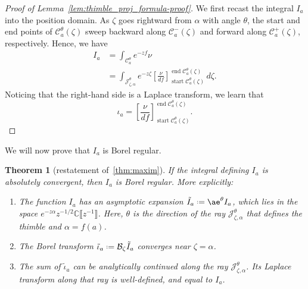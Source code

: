 \documentclass{article}
\newcommand{\C}{\mathbb{C}}
\newcommand{\series}[1]{\tilde{#1}}
\newcommand*{\defeq}{\mathrel{\vcenter{\baselineskip0.5ex \lineskiplimit0pt
                     \hbox{\scriptsize.}\hbox{\scriptsize.}}}%
                     =}
\newcommand{\borel}{\mathcal{B}}
\newcommand{\aexp}{\mathrm{\ae}}
\theoremstyle{definition}
\theoremstyle{plain}
\newtheorem{theorem}{Theorem}[section]
\begin{document}
\begin{proof}[Proof of Lemma~\ref{lem:thimble_proj_formula-proof}]
We first recast the integral $I_a$ into the position domain. As $\zeta$ goes rightward from $\alpha$ with angle $\theta$, the start and end points of $\mathcal{C}_a^\theta(\zeta)$ sweep backward along $\mathcal{C}^-_a(\zeta)$ and forward along $\mathcal{C}^+_a(\zeta)$, respectively. Hence, we have
\begin{align*}
I_a & = \int_{\mathcal{C}_a^\theta} e^{-zf} \nu \\
& = \int_{\mathcal{J}_{\zeta,\alpha}^\theta}e^{-z\zeta} \left[\frac{\nu}{df}\right]_{\operatorname{start} \mathcal{C}_a^\theta(\zeta)}^{\operatorname{end} \mathcal{C}_a^\theta(\zeta)}\,d\zeta.
\end{align*}
Noticing that the right-hand side is a Laplace transform, we learn that
\begin{equation}\label{thimble-difference}
{\iota}_a = \left[\frac{\nu}{df}\right]_{\operatorname{start} \mathcal{C}_a^\theta(\zeta)}^{\operatorname{end} \mathcal{C}_a^\theta(\zeta)}.
\end{equation}
\end{proof}
We will now prove that $I_a$ is Borel regular.
\begin{theorem}[restatement of~\ref{thm:maxim}]\label{thm:maxim-proof}
If the integral defining $I_a$ is absolutely convergent, then $I_a$ is Borel regular. More explicitly:
\begin{enumerate}
\item\label{part-1-prf} The function $I_a$ has an asymptotic expansion $\series{I}_a \defeq \aexp^\theta I_a$, which lies in the space $e^{-z \alpha} z^{-1/2} \C\llbracket z^{-1}\rrbracket$. Here, $\theta$ is the direction of the ray $\mathcal{J}^\theta_{\zeta, \alpha}$ that defines the thimble and $\alpha=f(a)$.
\item\label{part-2-prf} The Borel transform $\series{\iota}_a \defeq \borel_\zeta \series{I}_a$ converges near $\zeta = \alpha$.
\item\label{part-3-prf} The sum of $\series{\iota}_a$ can be analytically continued along the ray $\mathcal{J}_{\zeta, \alpha}^\theta$. Its Laplace transform along that ray is well-defined, and equal to $I_a$.
\end{enumerate}
\end{theorem}
\end{document}
